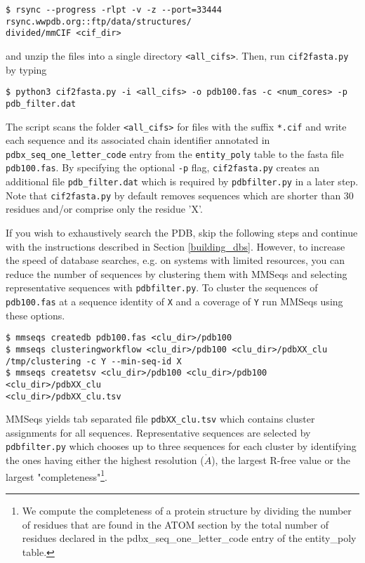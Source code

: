 \documentclass[11pt,a4paper]{article}
\begin{document}
\begin{verbatim}
$ rsync --progress -rlpt -v -z --port=33444 rsync.wwpdb.org::ftp/data/structures/
divided/mmCIF <cif_dir>
\end{verbatim}

and unzip the files into a single directory \verb`<all_cifs>`. Then, run \verb`cif2fasta.py` by typing

\begin{verbatim}
$ python3 cif2fasta.py -i <all_cifs> -o pdb100.fas -c <num_cores> -p pdb_filter.dat
\end{verbatim}

The script scans the folder \verb`<all_cifs>` for files with the suffix \verb`*.cif` and write each sequence and its associated chain identifier annotated in \verb`pdbx_seq_one_letter_code` entry from the \verb`entity_poly` table to the fasta file \verb`pdb100.fas`. By specifying the optional \verb`-p` flag, \verb`cif2fasta.py` creates an additional file \verb`pdb_filter.dat` which is required by \verb`pdbfilter.py` in a later step. Note that \verb`cif2fasta.py` by default removes sequences which are shorter than 30 residues and/or comprise only the residue 'X'. 

If you wish to exhaustively search the PDB, skip the following steps and continue with the instructions described in Section \ref{building_dbs}. However, to increase the speed of database searches, e.g. on systems with limited resources, you can reduce the number of sequences by clustering them with MMSeqs and selecting representative sequences with \verb`pdbfilter.py`. To cluster the sequences of \verb`pdb100.fas` at a sequence identity of \verb`X` and a coverage of \verb`Y` run MMSeqs using these options.

\begin{verbatim}
$ mmseqs createdb pdb100.fas <clu_dir>/pdb100
$ mmseqs clusteringworkflow <clu_dir>/pdb100 <clu_dir>/pdbXX_clu 
/tmp/clustering -c Y --min-seq-id X
$ mmseqs createtsv <clu_dir>/pdb100 <clu_dir>/pdb100 <clu_dir>/pdbXX_clu 
<clu_dir>/pdbXX_clu.tsv
\end{verbatim}

MMSeqs yields tab separated file \verb`pdbXX_clu.tsv` which contains cluster assignments for all sequences. Representative sequences are selected by \verb`pdbfilter.py` which chooses up to three sequences for each cluster by identifying the ones having either the highest resolution ($\mathring{A}$), the largest R-free value or the largest "completeness"\footnote{We compute the completeness of a protein structure by dividing the number of residues that are found in the ATOM section by the total number of residues declared in the pdbx\_seq\_one\_letter\_code entry of the entity\_poly table.}. 
\end{document}
